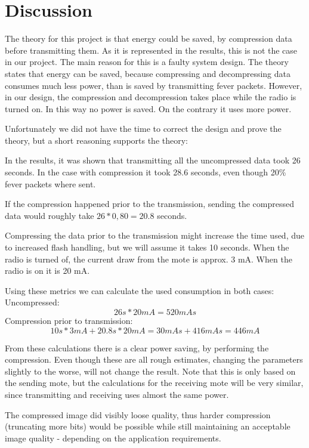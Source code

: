 \chapter{Discussion}

The theory for this project is that energy could be saved, by compression data before transmitting them. As it is represented in the results, this is not the case in our project. The main reason for this is a faulty system design. 
The theory states that energy can be saved, because compressing and decompressing data consumes much less power, than is saved by transmitting fever packets.
However, in our design, the compression and decompression takes place while the radio is turned on. In this way no power is saved. On the contrary it uses more power.

Unfortunately we did not have the time to correct the design and prove the theory, but a short reasoning supports the theory:

In the results, it was shown that transmitting all the uncompressed data took 26 seconds. In the case with compression it took 28.6 seconds, even though 20\% fever packets where sent. 

If the compression happened prior to the transmission, sending the compressed data would roughly take $26*0,80 = 20.8$ seconds. 

Compressing the data prior to the transmission might increase the time used, due to increased flash handling, but we will assume it takes 10 seconds.
When the radio is turned of, the current draw from the mote is approx. 3 mA. When the radio is on it is 20 mA. 

Using these metrics we can calculate the used consumption in both cases:\\
Uncompressed:
\begin{equation}
26 s * 20 mA = 520 mAs
\end{equation}
Compression prior to transmission:
\begin{equation}
10 s * 3 mA + 20.8 s * 20 mA = 30 mAs + 416 mAs  = 446 mA
\end{equation}

From these calculations there is a clear power saving, by performing the compression. Even though these are all rough estimates, changing the parameters slightly to the worse, will not change the result.
Note that this is only based on the sending mote, but the calculations for the receiving mote will be very similar, since transmitting and receiving uses almost the same power.

The compressed image did visibly loose quality, thus harder compression (truncating more bits) would be possible while still maintaining an acceptable image quality - depending on the application requirements. 